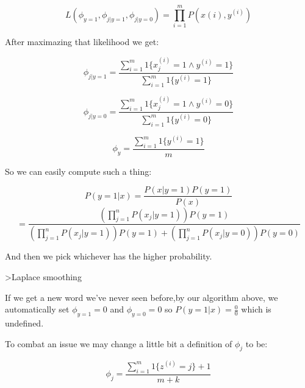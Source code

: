 $$L(\phi_{y=1}, \phi_{j \vert y=1}, \phi_{j \vert y=0}) = \prod_{i=1}^{m}P(x{(i)},y^{(i)})$$

After maximazing that likelihood we get:

$$\phi_{j \vert y=1} = \frac{\sum_{i=1}^{m}1\{x_{j}^{(i)} = 1 \wedge y^{(i)} = 1\}}{\sum_{i=1}^{m}1\{y^{(i)}=1\}}$$

$$\phi_{j \vert y=0} = \frac{\sum_{i=1}^{m}1\{x_{j}^{(i)} = 1 \wedge y^{(i)} = 0\}}{\sum_{i=1}^{m}1\{y^{(i)}=0\}}$$

$$\phi_{y} = \frac{\sum_{i=1}^{m}1\{y^{(i)} = 1\}}{m}$$

So we can easily compute such a thing:

$$ P(y=1 \vert x) = \frac{P(x \vert y=1) P(y=1)}{P(x)}$$ 
$$= \frac{(\prod_{j=1}^{n}P(x_{j} \vert y=1)) P(y=1)}{(\prod_{j=1}^{n}P(x_{j} \vert y=1))P(y=1) + (\prod_{j=1}^{n}P(x_{j} \vert y=0))P(y=0)}$$

And then we pick whichever has the higher probability.


>Laplace smoothing

If we get a new word we've never seen before,by our algorithm above, we automatically set $\phi_{y=1} = 0$ and $\phi_{y=0} = 0$ so $P(y=1 \vert x) = \frac{0}{0}$ which is undefined.

To combat an issue we may change a little bit a definition of $\phi_{j}$ to be:

$$\phi_{j} = \frac{\sum_{i=1}^{m}1\{z^{(i)} = j\} + 1}{m + k}$$
